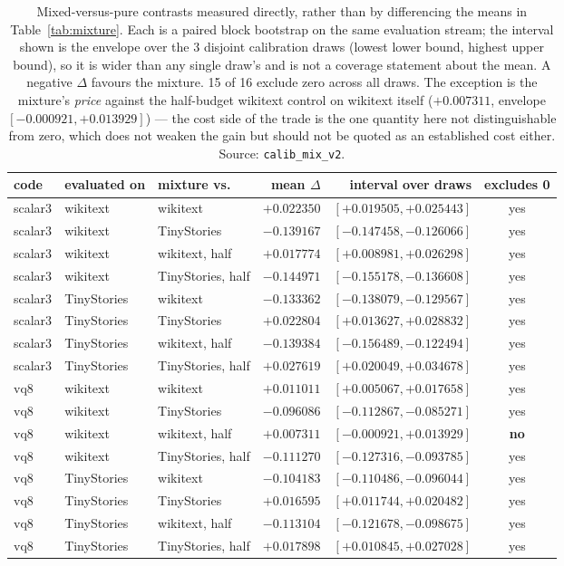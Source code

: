 \begin{table}[t]
\centering
\small
\begin{tabular}{lllrrc}
\toprule
code & evaluated on & mixture vs. & mean $\Delta$ & interval over draws & excludes 0 \\
\midrule
scalar3 & wikitext & wikitext & $+0.022350$ & $[+0.019505, +0.025443]$ & yes \\
scalar3 & wikitext & TinyStories & $-0.139167$ & $[-0.147458, -0.126066]$ & yes \\
scalar3 & wikitext & wikitext, half & $+0.017774$ & $[+0.008981, +0.026298]$ & yes \\
scalar3 & wikitext & TinyStories, half & $-0.144971$ & $[-0.155178, -0.136608]$ & yes \\
scalar3 & TinyStories & wikitext & $-0.133362$ & $[-0.138079, -0.129567]$ & yes \\
scalar3 & TinyStories & TinyStories & $+0.022804$ & $[+0.013627, +0.028832]$ & yes \\
scalar3 & TinyStories & wikitext, half & $-0.139384$ & $[-0.156489, -0.122494]$ & yes \\
scalar3 & TinyStories & TinyStories, half & $+0.027619$ & $[+0.020049, +0.034678]$ & yes \\
\midrule
vq8 & wikitext & wikitext & $+0.011011$ & $[+0.005067, +0.017658]$ & yes \\
vq8 & wikitext & TinyStories & $-0.096086$ & $[-0.112867, -0.085271]$ & yes \\
vq8 & wikitext & wikitext, half & $+0.007311$ & $[-0.000921, +0.013929]$ & \textbf{no} \\
vq8 & wikitext & TinyStories, half & $-0.111270$ & $[-0.127316, -0.093785]$ & yes \\
vq8 & TinyStories & wikitext & $-0.104183$ & $[-0.110486, -0.096044]$ & yes \\
vq8 & TinyStories & TinyStories & $+0.016595$ & $[+0.011744, +0.020482]$ & yes \\
vq8 & TinyStories & wikitext, half & $-0.113104$ & $[-0.121678, -0.098675]$ & yes \\
vq8 & TinyStories & TinyStories, half & $+0.017898$ & $[+0.010845, +0.027028]$ & yes \\
\bottomrule
\end{tabular}
\caption{Mixed-versus-pure contrasts measured directly, rather than by differencing the means in Table~\ref{tab:mixture}. Each is a paired block bootstrap on the same evaluation stream; the interval shown is the envelope over the 3 disjoint calibration draws (lowest lower bound, highest upper bound), so it is wider than any single draw's and is not a coverage statement about the mean. A negative $\Delta$ favours the mixture. 15 of 16 exclude zero across all draws. The exception is the mixture's \emph{price} against the half-budget wikitext control on wikitext itself ($+0.007311$, envelope $[-0.000921, +0.013929]$) --- the cost side of the trade is the one quantity here not distinguishable from zero, which does not weaken the gain but should not be quoted as an established cost either. Source: \texttt{calib\_mix\_v2}.}
\label{tab:mixcontrast}
\end{table}
